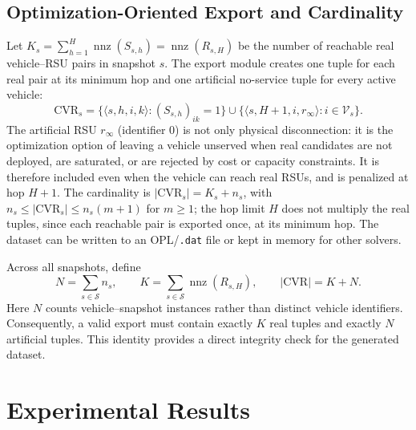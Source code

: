 \documentclass[engproc,proceedingpaper,submit,oneauthor]{Definitions/mdpi}
\newcommand{\nnz}{\operatorname{nnz}}
\newcommand{\CVR}{\mathrm{CVR}}
\begin{document}
\subsection{Optimization-Oriented Export and Cardinality}
Let $K_s=\sum_{h=1}^{H}\nnz(S_{s,h})=\nnz(R_{s,H})$ be the number of reachable real
vehicle--RSU pairs in snapshot $s$. The export module creates one tuple for each real
pair at its minimum hop and one artificial no-service tuple for every active vehicle:
\[
\CVR_s=
\{\langle s,h,i,k\rangle:(S_{s,h})_{ik}=1\}
\cup
\{\langle s,H+1,i,r_\infty\rangle:i\in\mathcal V_s\}.
\]
The artificial RSU $r_\infty$ (identifier $0$) is not only physical disconnection: it
is the optimization option of leaving a vehicle unserved when real candidates are not
deployed, are saturated, or are rejected by cost or capacity constraints. It is
therefore included even when the vehicle can reach real RSUs, and is penalized at hop
$H+1$. The cardinality is $|\CVR_s|=K_s+n_s$, with $n_s\le|\CVR_s|\le n_s(m+1)$ for
$m\ge 1$; the hop limit $H$ does not multiply the real tuples, since each reachable
pair is exported once, at its minimum hop. The dataset can be written to an
OPL/\texttt{.dat} file or kept in memory for other solvers.

Across all snapshots, define
\[
N=\sum_{s\in\mathcal S}n_s,\qquad
K=\sum_{s\in\mathcal S}\nnz(R_{s,H}),\qquad
|\CVR|=K+N.
\]
Here $N$ counts vehicle--snapshot instances rather than distinct vehicle identifiers.
Consequently, a valid export must contain exactly $K$ real tuples and exactly $N$
artificial tuples. This identity provides a direct integrity check for the generated
dataset.

\section{Experimental Results}\label{sec:results}
\end{document}
